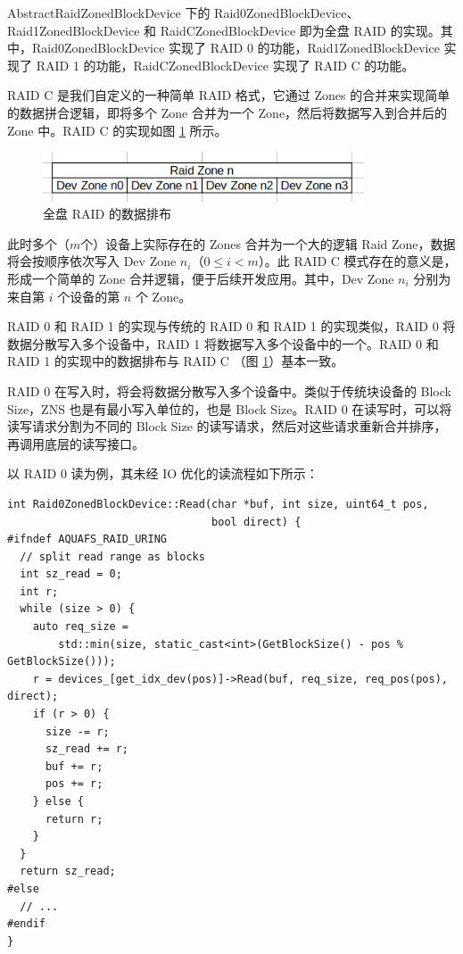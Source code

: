 AbstractRaidZonedBlockDevice 下的 Raid0ZonedBlockDevice、Raid1ZonedBlockDevice 和 RaidCZonedBlockDevice 即为全盘 RAID 的实现。其中，Raid0ZonedBlockDevice 实现了 RAID 0 的功能，Raid1ZonedBlockDevice 实现了 RAID 1 的功能，RaidCZonedBlockDevice 实现了 RAID C 的功能。

RAID C 是我们自定义的一种简单 RAID 格式，它通过 Zones 的合并来实现简单的数据拼合逻辑，即将多个 Zone 合并为一个 Zone，然后将数据写入到合并后的 Zone 中。RAID C 的实现如图 \ref{raid-c} 所示。

\begin{figure}[htbp]
  \centering
  \includegraphics[width=0.85\textwidth]{fig/raid-c}
  \caption{ 全盘 RAID 的数据排布 }
  \label{raid-c}
\end{figure}

此时多个（$m$个）设备上实际存在的 Zones 合并为一个大的逻辑 Raid Zone，数据将会按顺序依次写入 Dev Zone $n_{i}$（$0 \le i < m$）。此 RAID C 模式存在的意义是，形成一个简单的 Zone 合并逻辑，便于后续开发应用。其中，Dev Zone $n_i$ 分别为来自第 $i$ 个设备的第 $n$ 个 Zone。

RAID 0 和 RAID 1 的实现与传统的 RAID 0 和 RAID 1 的实现类似，RAID 0 将数据分散写入多个设备中，RAID 1 将数据写入多个设备中的一个。RAID 0 和 RAID 1 的实现中的数据排布与 RAID C （图 \ref{raid-c}）基本一致。

RAID 0 在写入时，将会将数据分散写入多个设备中。类似于传统块设备的 Block Size，ZNS 也是有最小写入单位的，也是 Block Size。RAID 0 在读写时，可以将读写请求分割为不同的 Block Size 的读写请求，然后对这些请求重新合并排序，再调用底层的读写接口。

以 RAID 0 读为例，其未经 IO 优化的读流程如下所示：

\begin{lstlisting}
int Raid0ZonedBlockDevice::Read(char *buf, int size, uint64_t pos,
                                bool direct) {
#ifndef AQUAFS_RAID_URING
  // split read range as blocks
  int sz_read = 0;
  int r;
  while (size > 0) {
    auto req_size =
        std::min(size, static_cast<int>(GetBlockSize() - pos % GetBlockSize()));
    r = devices_[get_idx_dev(pos)]->Read(buf, req_size, req_pos(pos), direct);
    if (r > 0) {
      size -= r;
      sz_read += r;
      buf += r;
      pos += r;
    } else {
      return r;
    }
  }
  return sz_read;
#else
  // ...
#endif
}
\end{lstlisting}

